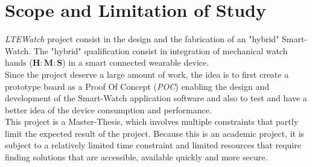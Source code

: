 \documentclass[Report.tex]{subfiles}
\begin{document}
\section{Scope and Limitation of Study}

\textit{LTEWatch} project consist in the design and the fabrication of an "hybrid" Smart-Watch. The "hybrid" qualification consist in integration of mechanical watch hands ($\mathbf{H:M:S}$) in a smart connected wearable device.\\

 Since the project deserve a large amount of work, the idea is to first create a prototype board as a Proof Of Concept (\textit{POC}) enabling the design and development of the Smart-Watch application software and also to test and have a better idea of the device consumption and performance.\\
 
This project is a Master-Thesis, which involves multiple constraints that partly limit the expected result of the project. Because this is an academic project, it is subject to a relatively limited time constraint and limited resources that require finding solutions that are accessible, available quickly and more secure.
\end{document}
